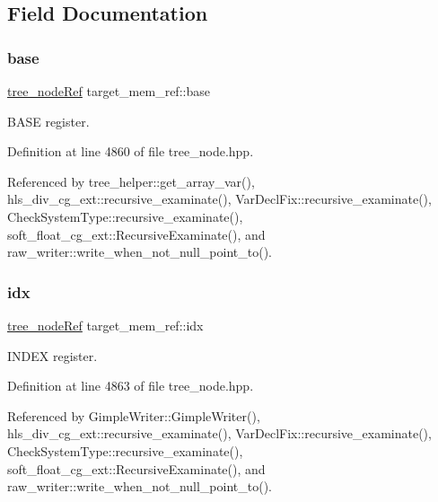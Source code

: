 \subsection{Field Documentation}
\mbox{\label{structtarget__mem__ref_a78910b23b0a6c9cfbb0f1484bf08846e}} 
\subsubsection{\texorpdfstring{base}{base}}
{\footnotesize\ttfamily \hyperlink{tree__node_8hpp_a6ee377554d1c4871ad66a337eaa67fd5}{tree\+\_\+node\+Ref} target\+\_\+mem\+\_\+ref\+::base}



B\+A\+SE register. 



Definition at line 4860 of file tree\+\_\+node.\+hpp.



Referenced by tree\+\_\+helper\+::get\+\_\+array\+\_\+var(), hls\+\_\+div\+\_\+cg\+\_\+ext\+::recursive\+\_\+examinate(), Var\+Decl\+Fix\+::recursive\+\_\+examinate(), Check\+System\+Type\+::recursive\+\_\+examinate(), soft\+\_\+float\+\_\+cg\+\_\+ext\+::\+Recursive\+Examinate(), and raw\+\_\+writer\+::write\+\_\+when\+\_\+not\+\_\+null\+\_\+point\+\_\+to().

\mbox{\label{structtarget__mem__ref_a0f9e445f332c9d78c813bae0dd7f7933}} 
\subsubsection{\texorpdfstring{idx}{idx}}
{\footnotesize\ttfamily \hyperlink{tree__node_8hpp_a6ee377554d1c4871ad66a337eaa67fd5}{tree\+\_\+node\+Ref} target\+\_\+mem\+\_\+ref\+::idx}



I\+N\+D\+EX register. 



Definition at line 4863 of file tree\+\_\+node.\+hpp.



Referenced by Gimple\+Writer\+::\+Gimple\+Writer(), hls\+\_\+div\+\_\+cg\+\_\+ext\+::recursive\+\_\+examinate(), Var\+Decl\+Fix\+::recursive\+\_\+examinate(), Check\+System\+Type\+::recursive\+\_\+examinate(), soft\+\_\+float\+\_\+cg\+\_\+ext\+::\+Recursive\+Examinate(), and raw\+\_\+writer\+::write\+\_\+when\+\_\+not\+\_\+null\+\_\+point\+\_\+to().

